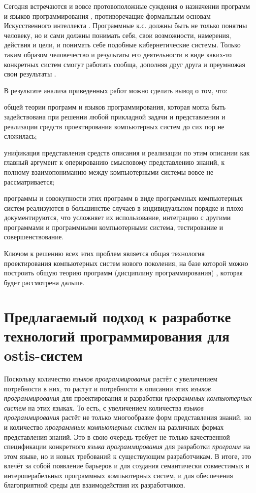 Сегодня встречаются и вовсе протовоположные суждения о назначении программ и языков программирования \cite{Rapaport2020}, противоречащие формальным основам Искусственного интеллекта \cite{Grimmelmann2022}. Программные к.с. должны быть не только понятны человеку, но и сами должны понимать себя, свои возможности, намерения, действия и цели, и понимать себе подобные кибернетические системы. Только таким образом человечество и результаты его деятельности в виде каких-то конкретных систем смогут работать сообща, дополняя друг друга и преумножая свои результаты .

В результате анализа приведенных работ можно сделать вывод о том, что:
\begin{textitemize}
    \item общей теории программ и языков программирования, которая могла быть задействована при решении любой прикладной задачи и представлении и реализации средств проектирования компьютерных систем до сих пор не сложилась;
    \item унификация представления средств описания и реализации по этим описании как главный аргумент к оперированию смысловому представлению знаний, к полному взаимопониманию между компьютерными системы вовсе не рассматривается;
    \item программы и совокупности этих программ в виде программных компьютерных систем реализуются в большинстве случаев в индивидуальном порядке и плохо документируются, что усложняет их использование, интеграцию с другими программами и программными компьютерными система, тестирование и совершенствование.
\end{textitemize}

Ключом к решению всех этих проблем является общая технология проектирования компьютерных систем нового поколения, на базе которой можно построить общую теорию программ (дисциплину программирования) \cite{Deikstra1978}, которая будет рассмотрена дальше.

\section{Предлагаемый подход к разработке технологий программирования для ostis-систем}
\label{sec_programs_solution}

Поскольку количество \textit{языков программирования} растёт с увеличением потребности в них, то растут и потребности в описании этих \textit{языков программирования} для проектирования и разработки \textit{программных компьютерных систем} на этих языках. То есть, с увеличением количества \textit{языков программирования} растёт не только многообразие форм представления знаний, но и количество \textit{программных компьютерных систем} на различных формах представления знаний. Это в свою очередь требует не только качественной спецификации конкретного \textit{языка программирования} для разработки \textit{программ} на этом языке, но и новых требований к существующим разработчикам. В итоге, это влечёт за собой появление барьеров и для создания семантически совместимых и интероперабельных программных компьютерных систем, и для обеспечения благоприятной среды для взаимодействия их разработчиков.

